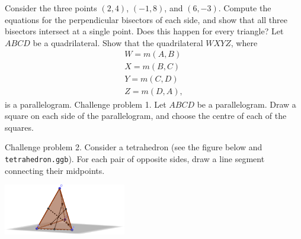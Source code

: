\begin{questions}
  \question Consider the three points $ (2,4) $, $ (-1,8) $, and $ (6,-3) $. Compute the equations
            for the perpendicular bisectors of each side, and show that all three bisectors intersect
            at a single point. Does this happen for every triangle?
  \question Let $ ABCD $ be a quadrilateral. Show that the quadrilateral $ WXYZ $, where
            \begin{gather*}
              W = m(A,B)\\
              X = m(B,C)\\
              Y = m(C,D)\\
              Z = m(D,A),
            \end{gather*}
            is a parallelogram.
  \clearpage
  \question Challenge problem 1. Let $ ABCD $ be a parallelogram. Draw a square on each side of the parallelogram, and choose
            the centre of each of the squares.
  \question Challenge problem 2. Consider a tetrahedron (see the figure below and \texttt{tetrahedron.ggb}). For each pair of opposite sides, draw
            a line segment connecting their midpoints.
            \begin{center}
              \includegraphics[width=0.4\textwidth]{tetrahedron}
            \end{center}
\end{questions}


